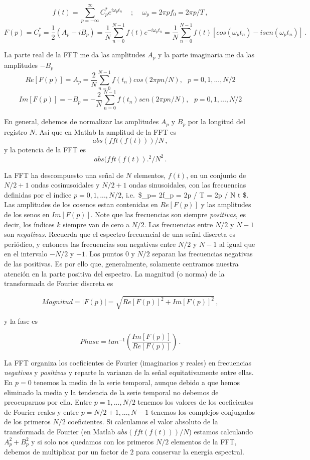\documentclass[
]{agujournal2019}
\begin{document}
\[f(t)=\sum\limits^\infty_{p=-\infty} C^*_p e^{i\omega_p t_n}\,\,\,\,\,\,\,;\,\,\,\,\,\,\,\omega_p=2 \pi p f_0=2\pi p/T\,,\]
\[F(p)=C^*_p=\frac{1}{2}(A_p-iB_p)=\frac{1}{N} \sum\limits^{N-1}_{n=0} f(t) e^{-i \omega_p t_n} =
        \frac{1}{N} \sum\limits^{N-1}_{n=0}f(t) [cos(\omega_p t_n) - isen(\omega_p t_n) ]\,.\]

La parte real de la FFT me da las amplitudes \(A_p\) y la parte
imaginaria me da las amplitudes \(-B_p\)
\[Re [F(p)]=A_p=\frac{2}{N}\sum\limits_{n=0}^{N-1} f(t_n) cos(2\pi p n /N),\,\,\,\,p=0,1,...,N/2\]
\[Im [F(p)]=-B_p=-\frac{2}{N}\sum\limits_{n=0}^{N-1} f(t_n) sen(2\pi p n /N),\,\,\,\,p=0,1,...,N/2\]

En general, debemos de normalizar las amplitudes \(A_p\) y \(B_p\) por
la longitud del registro \(N\). Así que en Matlab la amplitud de la FFT
es \[{ abs}({ fft}(f(t)))/N\,,\] y la potencia de la FFT es
\[{ abs}({ fft}(f(t)).^2/N^2\,.\]

La FFT ha descompuesto una señal de \(N\) elementos, \(f(t)\), en un
conjunto de \(N/2 +1\) ondas cosinusoidales y \(N/2 + 1\) ondas
sinusoidales, con las frecuencias definidas por el índice
\(p=0,1,...,N/2\), i.e.~\$\omega\_p= 2\pi f\_p = 2\pi p / T = 2\pi p / N
\Delta t \$. Las amplitudes de los cosenos estan contenidas en
\(Re [F(p)]\) y las amplitudes de los senos en \(Im [F(p)]\). Note que
las frecuencias son siempre \emph{positivas}, es decir, los índices
\(k\) siempre van de cero a \(N/2\). Las frecuencias entre \(N/2\) y
\(N-1\) son \emph{negativas}. Recuerda que el espectro frecuencial de
una señal discreta es periódico, y entonces las frecuencias son
negativas entre \(N/2\) y \(N-1\) al igual que en el intervalo \(-N/2\)
y \(-1\). Los puntos \(0\) y \(N/2\) separan las frecuencias negativas
de las positivas. Es por ello que, generalmente, solamente centramos
nuestra atención en la parte positiva del espectro. La magnitud (o
norma) de la transformada de Fourier discreta es

\[{ Magnitud}=|F(p)|=\sqrt{Re [F(p)]^2 + Im[F(p)]^2}\,,\]

y la fase es

\[Phase=tan^{-1}\left( \frac{Im[F(p)]}{Re [F(p)]} \right)\,.\]

La FFT organiza los coeficientes de Fourier (imaginarios y reales) en
frecuencias \emph{negativas} y \emph{positivas} y reparte la varianza de
la señal equitativamente entre ellas. En \(p=0\) tenemos la media de la
serie temporal, aunque debido a que hemos eliminado la media y la
tendencia de la serie temporal no debemos de preocuparnos por ella.
Entre \(p=1,...,N/2\) tenemos los valores de los coeficientes de Fourier
reales y entre \(p=N/2+1,...,N-1\) tenemos los complejos conjugados de
los primeros \(N/2\) coeficientes. Si calculamos el valor absoluto de la
transformada de Fourier (en Matlab \({ abs}({ fft}(f(t)))/N\)) estamos
calculando \(A_p^2 + B_p^2\) y si solo nos quedamos con los primeros
\(N/2\) elementos de la FFT, debemos de multiplicar por un factor de
\(2\) para conservar la energía espectral.
\end{document}
